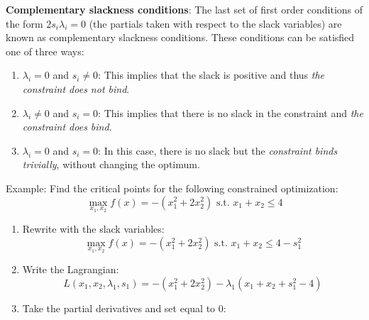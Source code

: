 \documentclass[]{book}
\providecommand{\tightlist}{%
  \setlength{\itemsep}{0pt}\setlength{\parskip}{0pt}}
\theoremstyle{definition}
\theoremstyle{definition}
\theoremstyle{definition}
\theoremstyle{remark}
\begin{document}
\textbf{Complementary slackness conditions}: The last set of first order conditions of the form \(2s_i\lambda_i = 0\) (the partials taken with respect to the slack variables) are known as complementary slackness conditions. These conditions can be satisfied one of three ways:

\begin{enumerate}
\def\labelenumi{\arabic{enumi}.}
\tightlist
\item
  \(\lambda_i = 0\) and \(s_i \neq 0\): This implies that the slack is positive and thus \emph{the constraint does not bind}.
\item
  \(\lambda_i \neq 0\) and \(s_i = 0\): This implies that there is no slack in the constraint and \emph{the constraint does bind}.
\item
  \(\lambda_i = 0\) and \(s_i = 0\): In this case, there is no slack but the \emph{constraint binds trivially}, without changing the optimum.
\end{enumerate}

Example: Find the critical points for the following constrained optimization:
\[\max_{x_1,x_2} f(x) = -(x_1^2 + 2x_2^2) \text{ s.t. } x_1 + x_2 \le 4\]

\begin{enumerate}
\def\labelenumi{\arabic{enumi}.}
\item
  Rewrite with the slack variables:
  \[\max_{x_1,x_2} f(x) = -(x_1^2 + 2x_2^2) \text{ s.t. } x_1 + x_2 \le 4 - s_1^2\]
\item
  Write the Lagrangian:
  \[L(x_1,x_2,\lambda_1,s_1) = -(x_1^2 + 2x_2^2) - \lambda_1 (x_1 + x_2 + s_1^2 - 4)\]
\item
  Take the partial derivatives and set equal to 0:
\end{enumerate}
\end{document}
